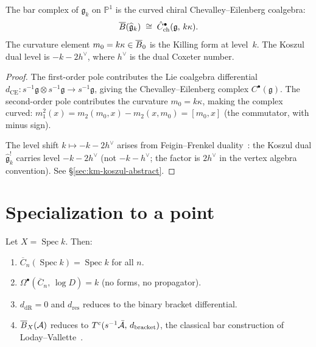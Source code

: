 \begin{theorem}[\ClaimStatusProvedHere]
\label{thm:fourier-km-bar}
The bar complex of $\widehat{\mathfrak{g}}_k$ on $\mathbb{P}^1$ is
the curved chiral Chevalley--Eilenberg coalgebra:
\begin{equation}\label{eq:fourier-km-bar}
\overline{B}(\widehat{\mathfrak{g}}_k) \;\cong\;
\hat{C}^\bullet_{\mathrm{ch}}(\mathfrak{g},\, k\kappa).
\end{equation}
The curvature element $m_0 = k\kappa \in \overline{B}_0$ is the Killing
form at level~$k$.  The Koszul dual level is $-k - 2h^\vee$, where
$h^\vee$ is the dual Coxeter number.
\end{theorem}

\begin{proof}
The first-order pole contributes the Lie coalgebra differential
$d_{\mathrm{CE}}\colon s^{-1}\mathfrak{g} \otimes
s^{-1}\mathfrak{g} \to s^{-1}\mathfrak{g}$, giving the
Chevalley--Eilenberg complex $C^\bullet(\mathfrak{g})$.  The
second-order pole contributes the curvature $m_0 = k\kappa$, making
the complex curved: $m_1^2(x) = m_2(m_0, x) - m_2(x, m_0) =
[m_0, x]$ (the commutator, with minus sign).

The level shift $k \mapsto -k - 2h^\vee$ arises from Feigin--Frenkel
duality~\cite{Feigin-Frenkel}: the Koszul dual
$\widehat{\mathfrak{g}}_k^!$ carries level $-k - 2h^\vee$ (not
$-k - h^\vee$; the factor is $2h^\vee$ in the vertex algebra
convention).  See \S\ref{sec:km-koszul-abstract}.
\end{proof}


\section{Specialization to a point}\label{sec:fourier-specialization}

\begin{theorem}
\label{thm:fourier-specialization}
Let $X = \operatorname{Spec} k$.  Then:
\begin{enumerate}
\item $\overline{C}_n(\operatorname{Spec} k) = \operatorname{Spec} k$
  for all $n$.
\item $\Omega^\bullet(\overline{C}_n,\, \log D) = k$ (no forms, no
  propagator).
\item $d_{\mathrm{dR}} = 0$ and $d_{\mathrm{res}}$ reduces to the
  binary bracket differential.
\item $\overline{B}_X(\mathcal{A})$ reduces to
  $T^c(s^{-1}\bar{\mathcal{A}},\, d_{\mathrm{bracket}})$, the classical bar
  construction of Loday--Vallette~\cite[\S2.2]{LV12}.
\end{enumerate}
\end{theorem}

